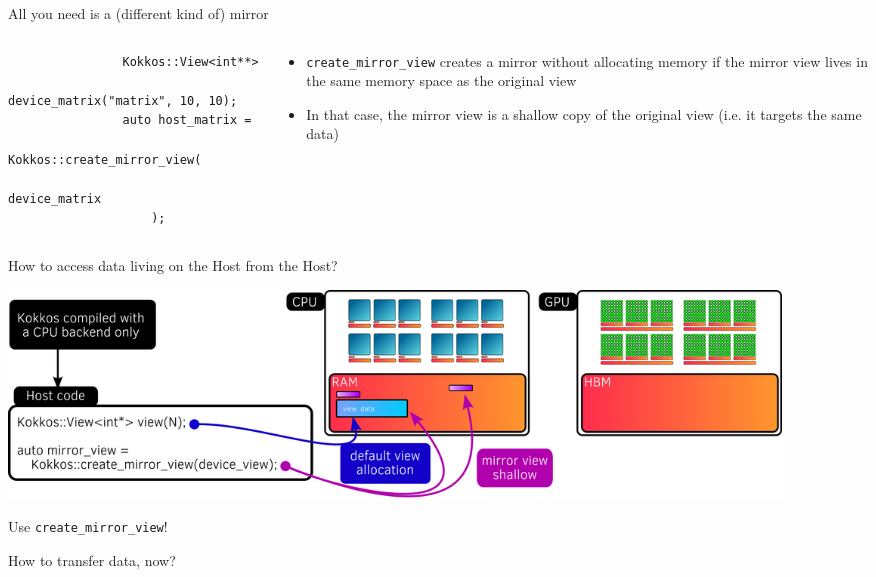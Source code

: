 \documentclass[aspectratio=169]{beamer}
\begin{document}
\begin{frame}[fragile]{All you need is a (different kind of) mirror}
    \begin{columns}
        \begin{column}{0.6\linewidth}
            \begin{verbatim}
                Kokkos::View<int**>
                    device_matrix("matrix", 10, 10);
                auto host_matrix =
                    Kokkos::create_mirror_view(
                        device_matrix
                    );
            \end{verbatim}
        \end{column}
        \begin{column}{0.4\linewidth}
            \begin{itemize}
                \item \texttt{create\_mirror\_view} creates a mirror without allocating memory if the mirror view lives in the same memory space as the original view
                \item In that case, the mirror view is a shallow copy of the original view (i.e. it targets the same data)
            \end{itemize}
        \end{column}
    \end{columns}
\end{frame}


\begin{frame}{How to access data living on the Host from the Host?}
    \begin{center}
        \includegraphics[width=0.9\textwidth]{host_create_mirror_view.png}
    \end{center}

     Use \texttt{create\_mirror\_view}!

     How to transfer data, now?
\end{frame}

\end{document}
